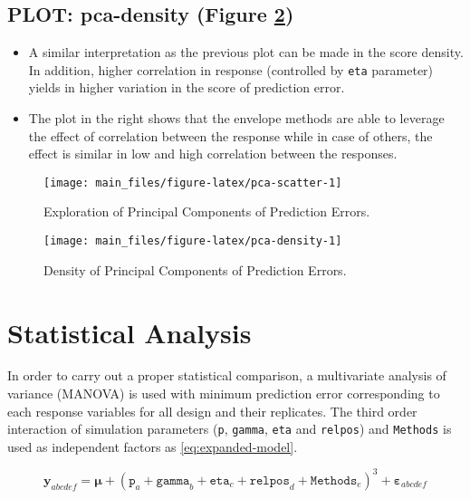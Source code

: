 \documentclass[12pt,3p,authoryear]{elsarticle}
\providecommand{\tightlist}{%
  \setlength{\itemsep}{0pt}\setlength{\parskip}{0pt}}
\theoremstyle{definition}
\theoremstyle{definition}
\theoremstyle{definition}
\theoremstyle{remark}
\begin{document}
\subsection{PLOT: pca-density (Figure
\ref{fig:pca-density})}\label{plot-pca-density-figure-reffigpca-density}

\begin{itemize}
\tightlist
\item
  A similar interpretation as the previous plot can be made in the score
  density. In addition, higher correlation in response (controlled by
  \texttt{eta} parameter) yields in higher variation in the score of
  prediction error.
\item
  The plot in the right shows that the envelope methods are able to
  leverage the effect of correlation between the response while in case
  of others, the effect is similar in low and high correlation between
  the responses.
\end{itemize}

\begin{figure}
\texttt{[image: main\_files/figure-latex/pca-scatter-1]} \caption{Exploration of Principal Components of Prediction Errors.}\label{fig:pca-scatter}
\end{figure}

\begin{figure}
\texttt{[image: main\_files/figure-latex/pca-density-1]} \caption{Density of Principal Components of Prediction Errors.}\label{fig:pca-density}
\end{figure}

\section{Statistical Analysis}\label{statistical-analysis}

In order to carry out a proper statistical comparison, a multivariate
analysis of variance (MANOVA) is used with minimum prediction error
corresponding to each response variables for all design and their
replicates. The third order interaction of simulation parameters
(\texttt{p}, \texttt{gamma}, \texttt{eta} and \texttt{relpos}) and
\texttt{Methods} is used as independent factors as
\eqref{eq:expanded-model}.

\begin{equation}
\mathbf{y}_{abcdef} = \boldsymbol{\mu} + (\texttt{p}_a + \texttt{gamma}_b + \texttt{eta}_c + \texttt{relpos}_d + \texttt{Methods}_e)^3 + \boldsymbol{\varepsilon}_{abcdef}
\label{eq:expanded-model}
\end{equation}
\end{document}
